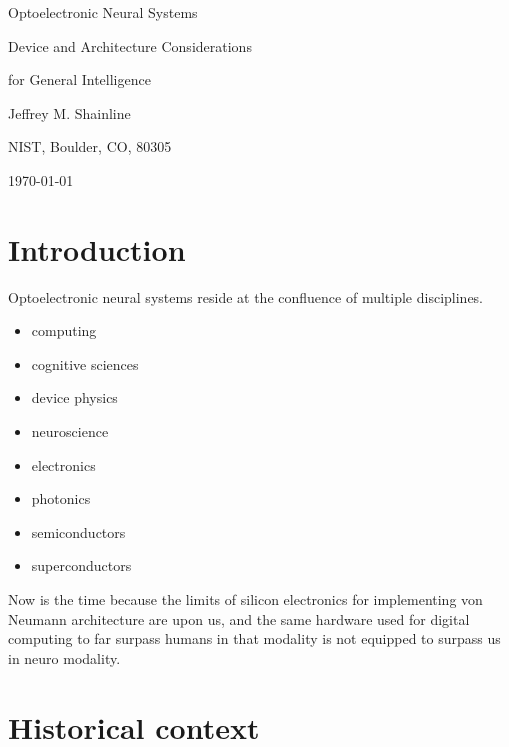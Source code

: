 \documentclass[twocolumn]{article}
\begin{document}
	
	\centerline{\LARGE Optoelectronic Neural Systems}
	\vspace{0.5em}
	\centerline{\Large Device and Architecture Considerations}
	\vspace{0.25em}
	\centerline{\Large for General Intelligence}
	\vspace{0.75em}
	\centerline{\large Jeffrey M. Shainline}
	\vspace{0.5em}
	\centerline{\normalsize NIST, Boulder, CO, 80305}
	\vspace{0.5em}
	\centerline{\small \today}
	
\begin{abstract}

\end{abstract}

\tableofcontents

\section{\label{sec:introduction}Introduction}
Optoelectronic neural systems reside at the confluence of multiple disciplines. 

\begin{itemize}
\item computing
\item cognitive sciences
\item device physics
\item neuroscience
\item electronics
\item photonics
\item semiconductors
\item superconductors
\end{itemize}

Now is the time because the limits of silicon electronics for implementing von Neumann architecture are upon us, and the same hardware used for digital computing to far surpass humans in that modality is not equipped to surpass us in neuro modality.

\section{\label{sec:history}Historical context}
\end{document}

